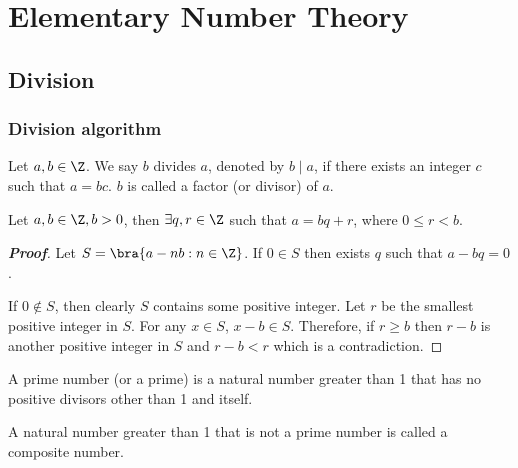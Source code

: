 \chapter{Elementary Number Theory}

\section{Division}

\subsection{Division algorithm}

\begin{definition}
Let $a,b\in \Z$. We say $b$ divides $a$, denoted by $b\mid a$, if there exists an integer $c$ such that $a = bc$. $b$ is called a factor (or divisor) of $a$.
\end{definition}

\begin{lemma}\label{lem:integer_division_remainder}
Let $a,b \in \Z, b>0$, then $\exists q,r \in \Z$ such that $a=bq+r$, where $0 \leq r <b$.
\end{lemma}

\begin{proof}[\bf Proof]
Let $S =\bra{a - nb: n \in \Z}$. If $0\in S$ then exists $q$ such that $a-bq =0$.

If $0\notin S$, then clearly $S$ contains some positive integer. Let $r$ be the smallest positive integer in $S$. For any $x\in S$, $x-b\in S$. Therefore, if $r\geq b$ then $r-b$ is another positive integer in $S$ and $r-b<r$ which is a contradiction.%
\end{proof}

\begin{definition}
A prime number (or a prime) is a natural number greater than 1 that has no positive divisors other than 1 and itself.

A natural number greater than 1 that is not a prime number is called a composite number.
\end{definition}


